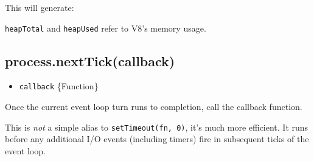 \begin{Shaded}
\begin{Highlighting}[]
 \NormalTok{(}\NormalTok{);}

\NormalTok{(}\NormalTok{(}\NormalTok{()));}
\end{Highlighting}
\end{Shaded}

This will generate:

\begin{Shaded}
\begin{Highlighting}[]
\NormalTok{\{ }\NormalTok{: }\NormalTok{,}
  \NormalTok{: }\NormalTok{,}
  \NormalTok{: } \NormalTok{\}}
\end{Highlighting}
\end{Shaded}

\texttt{heapTotal} and \texttt{heapUsed} refer to V8's memory usage.

\subsection{process.nextTick(callback)}\label{process.nexttickcallback}

\begin{itemize}
\itemsep1pt\parskip0pt
\item
  \texttt{callback} \{Function\}
\end{itemize}

Once the current event loop turn runs to completion, call the callback
function.

This is \emph{not} a simple alias to \texttt{setTimeout(fn, 0)}, it's
much more efficient. It runs before any additional I/O events (including
timers) fire in subsequent ticks of the event loop.

\begin{Shaded}
\begin{Highlighting}[]
\NormalTok{(}\NormalTok{);}
\NormalTok{(}\NormalTok{() \{}
  \NormalTok{(}\NormalTok{);}
\NormalTok{\});}
\NormalTok{(}\NormalTok{);}
\end{Highlighting}
\end{Shaded}

